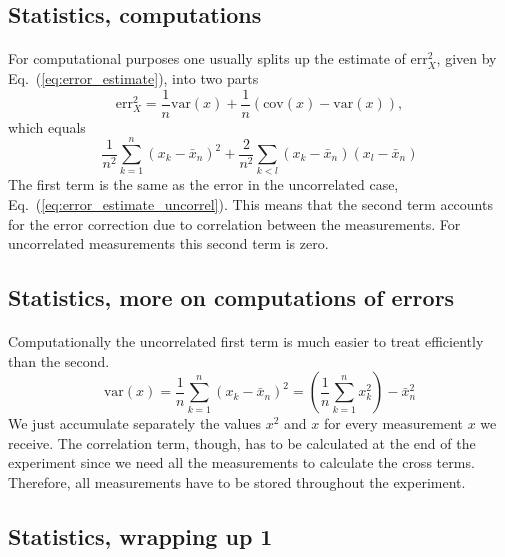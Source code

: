 \documentclass[%
oneside,                 %
final,                   %
10pt]{article}
\begin{document}
\subsection*{Statistics, computations}

\paragraph{}
For computational purposes one usually splits up the estimate of
$\mathrm{err}_X^2$, given by Eq.~(\ref{eq:error_estimate}), into two
parts
\[
\mathrm{err}_X^2 = \frac{1}{n}\mathrm{var}(x) + \frac{1}{n}(\mathrm{cov}(x)-\mathrm{var}(x)),
\]
which equals
\begin{equation}
\frac{1}{n^2}\sum_{k=1}^n (x_k - \bar x_n)^2 +\frac{2}{n^2}\sum_{k<l} (x_k - \bar x_n)(x_l - \bar x_n)
\label{eq:error_estimate_split_up}
\end{equation}
The first term is the same as the error in the uncorrelated case,
Eq.~(\ref{eq:error_estimate_uncorrel}). This means that the second
term accounts for the error correction due to correlation between the
measurements. For uncorrelated measurements this second term is zero.



\subsection*{Statistics, more on computations of errors}

\paragraph{}
Computationally the uncorrelated first term is much easier to treat
efficiently than the second.
\[
\mathrm{var}(x) = \frac{1}{n}\sum_{k=1}^n (x_k - \bar x_n)^2 =
\left(\frac{1}{n}\sum_{k=1}^n x_k^2\right) - \bar x_n^2
\]
We just accumulate separately the values $x^2$ and $x$ for every
measurement $x$ we receive. The correlation term, though, has to be
calculated at the end of the experiment since we need all the
measurements to calculate the cross terms. Therefore, all measurements
have to be stored throughout the experiment.



\subsection*{Statistics, wrapping up 1}
\end{document}
